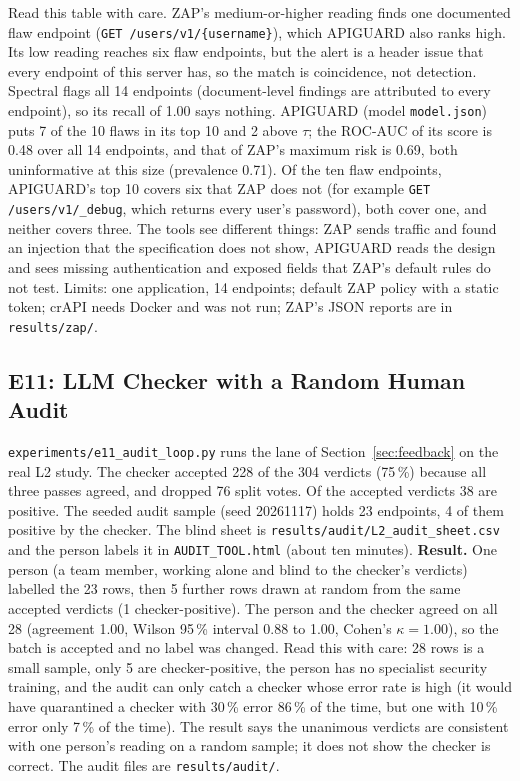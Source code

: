 \documentclass[conference]{IEEEtran}
\begin{document}
Read this table with care. ZAP's medium-or-higher reading finds one documented flaw endpoint (\texttt{GET /users/v1/\{username\}}), which APIGUARD also ranks high. Its low reading reaches six flaw endpoints,
but the alert is a header issue that every endpoint of this server has, so the match is coincidence, not detection. Spectral flags all 14 endpoints (document-level findings are attributed to every endpoint), so its recall of 1.00 says nothing.
APIGUARD (model \texttt{model.json}) puts 7 of the 10 flaws in its top 10 and 2 above $\tau$; the ROC-AUC of its score is 0.48 over all 14 endpoints, and that of ZAP's maximum risk is 0.69, both uninformative at this size (prevalence 0.71).
Of the ten flaw endpoints, APIGUARD's top 10 covers six that ZAP does not (for example \texttt{GET /users/v1/\_debug}, which returns every user's password), both cover one, and neither covers three. The tools see different things: ZAP sends traffic and found an injection that the specification does not show, APIGUARD reads the design and
sees missing authentication and exposed fields that ZAP's default rules do not test. Limits: one application, 14 endpoints; default ZAP policy with a static token; crAPI needs Docker and was not run; ZAP's JSON reports are in \texttt{results/zap/}.

\subsection{E11: LLM Checker with a Random Human Audit}
\label{sec:e11}
\texttt{experiments/e11\_audit\_loop.py} runs the lane of Section~\ref{sec:feedback} on the real L2 study. The checker accepted 228 of the 304 verdicts (75\,\%) because all three passes agreed, and dropped 76 split votes. Of the accepted verdicts 38 are positive.
The seeded audit sample (seed 20261117) holds 23 endpoints, 4 of them positive by the checker. The blind sheet is \texttt{results/audit/L2\_audit\_sheet.csv} and the person labels it in \texttt{AUDIT\_TOOL.html} (about ten minutes).
\textbf{Result.} One person (a team member, working alone and blind to the checker's verdicts) labelled the 23 rows, then 5 further rows drawn at random from the same accepted verdicts (1 checker-positive). The person and the checker agreed on all 28 (agreement 1.00, Wilson 95\,\% interval 0.88 to 1.00, Cohen's $\kappa=1.00$), so the batch is accepted and no label was changed. Read this with care: 28 rows is a small sample, only 5 are checker-positive, the person has no specialist security training, and the audit can only catch a checker whose error rate is high (it would have quarantined a checker with 30\,\% error 86\,\% of the time, but one with 10\,\% error only 7\,\% of the time). The result says the unanimous verdicts are consistent with one person's reading on a random sample; it does not show the checker is correct. The audit files are \texttt{results/audit/}.
\end{document}
